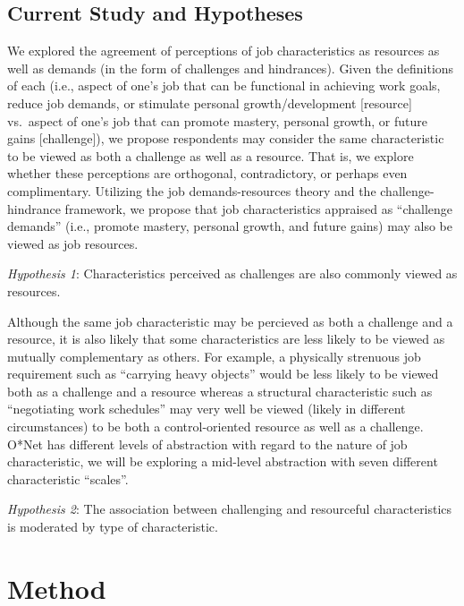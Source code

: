 \documentclass[
  man]{apa6}
\begin{document}
\hypertarget{current-study-and-hypotheses}{%
\subsection{Current Study and Hypotheses}\label{current-study-and-hypotheses}}

We explored the agreement of perceptions of job characteristics as resources as well as demands (in the form of challenges and hindrances). Given the definitions of each (i.e., aspect of one's job that can be functional in achieving work goals, reduce job demands, or stimulate personal growth/development {[}resource{]} vs.~aspect of one's job that can promote mastery, personal growth, or future gains {[}challenge{]}), we propose respondents may consider the same characteristic to be viewed as both a challenge as well as a resource. That is, we explore whether these perceptions are orthogonal, contradictory, or perhaps even complimentary. Utilizing the job demands-resources theory and the challenge-hindrance framework, we propose that job characteristics appraised as ``challenge demands'' (i.e., promote mastery, personal growth, and future gains) may also be viewed as job resources.

\emph{Hypothesis 1}: Characteristics perceived as challenges are also commonly viewed as resources.

Although the same job characteristic may be percieved as both a challenge and a resource, it is also likely that some characteristics are less likely to be viewed as mutually complementary as others. For example, a physically strenuous job requirement such as ``carrying heavy objects'' would be less likely to be viewed both as a challenge and a resource whereas a structural characteristic such as ``negotiating work schedules'' may very well be viewed (likely in different circumstances) to be both a control-oriented resource as well as a challenge. O*Net has different levels of abstraction with regard to the nature of job characteristic, we will be exploring a mid-level abstraction with seven different characteristic ``scales''.

\emph{Hypothesis 2}: The association between challenging and resourceful characteristics is moderated by type of characteristic.

\hypertarget{method}{%
\section{Method}\label{method}}
\end{document}
